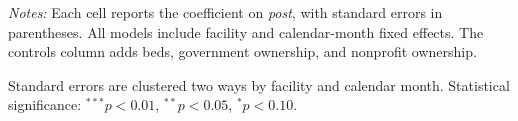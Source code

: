 \documentclass[12pt]{article}
\begin{document}
\begin{table}[H]
\begin{threeparttable}
\begin{tablenotes}[flushleft]
\footnotesize
\item \textit{Notes:} Each cell reports the coefficient on \textit{post}, with standard errors in parentheses. All models include facility and calendar-month fixed effects. The controls column adds beds, government ownership, and nonprofit ownership.
\item Standard errors are clustered two ways by facility and calendar month. Statistical significance: $^{***}p<0.01$, $^{**}p<0.05$, $^{*}p<0.10$.
\end{tablenotes}
\end{threeparttable}
\end{table}
\end{document}
